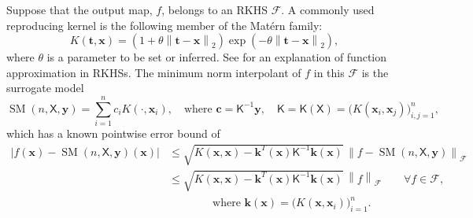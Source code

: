 \documentclass[11pt]{NSFamsart}
\DeclareMathOperator{\SURR}{SM} %
\newcommand{\mK}{\mathsf{K}}
\newcommand{\mX}{\mathsf{X}}
\newcommand{\bc}{{\boldsymbol{c}}}
\newcommand{\bx}{{\boldsymbol{x}}}
\newcommand{\bk}{{\boldsymbol{k}}}
\newcommand{\by}{{\boldsymbol{y}}}
\newcommand{\bt}{{\boldsymbol{t}}}
\newcommand{\calf}{{\mathcal{F}}}
\def\abs#1{\ensuremath{\left \lvert #1 \right \rvert}}
\newcommand{\norm}[2][{}]{\ensuremath{\left \lVert #2 \right \rVert}_{#1}}
\begin{document}
Suppose that the output map, $f$, belongs to an RKHS $\calf$.  A commonly used reproducing kernel is the following member of the Mat\'ern family:
\begin{equation} \label{eq:MatKer}
    K(\bt,\bx) = (1 + \theta \norm[2]{\bt-\bx}) \exp(-\theta\norm[2]{\bt-\bx}),
\end{equation}
where $\theta$ is a parameter to be set or inferred.  See \cite{Buh00, Fas07a, FasMcC15a, ForFly15a, ForEtal09, SchWen06a, Wen05a} for an explanation of function approximation in RKHSs.  The minimum norm interpolant of $f$ in this $\calf$ is the surrogate model
\begin{equation} \label{appxExOne}
    \SURR(n,\mX,\by) = \sum_{i=1}^n c_i K(\cdot, \bx_i), \quad \text{where } \bc = \mK^{-1} \by, \quad \mK = \mK(\mX) = \bigl( K(\bx_i,\bx_j) \bigr)_{i,j=1}^n, 
\end{equation}
which has a known pointwise error bound of
\begin{align}
\label{RKHSErrBd}
    \abs{f(\bx) - \SURR(n,\mX,\by)(\bx)} & \le \sqrt{K(\bx,\bx) - \bk^T(\bx) \mK^{-1} \bk(\bx)} \, \norm[\calf]{f - \SURR(n,\mX,\by)} \\
    \nonumber
    & \le \sqrt{K(\bx,\bx) - \bk^T(\bx) \mK^{-1} \bk(\bx)} \, \norm[\calf]{f} \qquad \forall f \in \calf, \\
    \nonumber
    & \qquad \qquad \text{where }  \bk(\bx) = \bigl(K(\bx,\bx_i) \bigr)_{i=1}^n.
\end{align}
\end{document}
